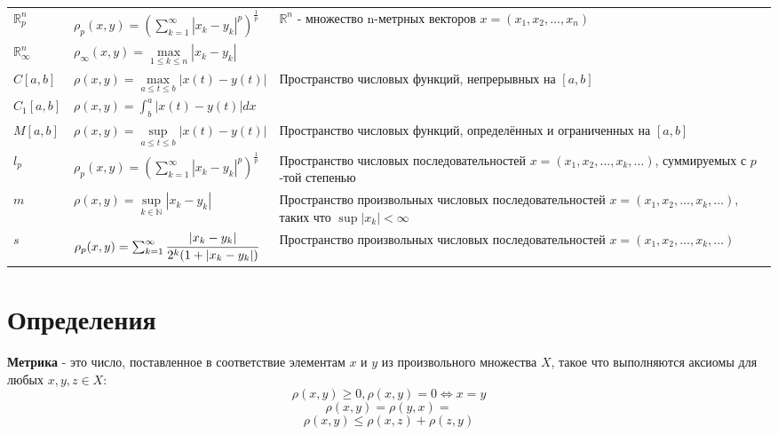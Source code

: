 {\begin{tabular}{||p{2.5cm}|m{6cm}|p{7cm}||}
      $\mathbb{R}^n_p$      & $\rho_p (x, y)=(\sum_{k = 1}^{\infty}|x_k-y_k|^p)^\frac{1}{p}$            & \multirow{2}{6cm}{$\mathbb{R}^n$ - множество n-метрных векторов $x=(x_1, x_2, \dots, x_n)$  }                         \\
      \cline{1-2}
      $\mathbb{R}^n_\infty$ & $\rho_\infty (x, y)=\underset{1\leq k\leq n}{\max}|x_k-y_k|$              &                                                                                                                    \\
      \hline
      $C[a, b]$              & $\rho (x, y)=\underset{a \leq t \leq b}{\max}|x(t)-y(t)|$                 & \multirow{2}{6cm}{Пространство числовых функций, непрерывных на $[a, b]$}                                           \\
      \cline{1-2}
      $C_1[a, b]$            & $\rho (x, y)=\int_{b}^{a}|x(t)-y(t)|dx $                                &                                                                                                                    \\[5pt]
      \hline
      $M[a, b]$              & $\rho (x, y)=\underset{a \leq t \leq b}{\sup}|x(t)-y(t)|$                 & Пространство числовых функций, определённых и ограниченных на $[a, b]$                                              \\
      \hline
      $l_p$                 & $\rho_p (x, y)=(\sum_{k = 1}^{\infty}|x_k-y_k|^p)^\frac{1}{p}$            & Пространство числовых последовательностей $x=(x_1, x_2, \dots, x_k, \dots)$, суммируемых с $p$-той степенью            \\
      \hline
      $m$                   & $\rho (x, y)=\underset{k \in \mathbb{N} }{\sup}|x_k-y_k|$                 & Пространство произвольных числовых последовательностей $x=(x_1, x_2, \dots, x_k, \dots)$, таких что $\sup|x_k|<\infty$ \\
      \hline
      $s$                   & $\rho_p (x, y)=\sum_{k = 1}^{\infty} \cfrac{|x_k-y_k|}{2^k(1+|x_k-y_k|)}$ & Пространство произвольных числовых последовательностей $x=(x_1, x_2, \dots, x_k, \dots)$                               \\
      \hline
  \end{tabular}}


\section{Определения}

\textbf{Метрика} - это число, поставленное в соответствие элементам $x$ и $y$ из произвольного множества $X$, такое что выполняются аксиомы для любых $x, y, z\in X$:
\[\rho(x, y)\geq 0, \rho(x, y)=0\Longleftrightarrow x=y\]
\[\rho(x, y)=\rho(y, x)=\]
\[\rho(x, y)\leqslant \rho(x, z)+\rho(z, y)\]

